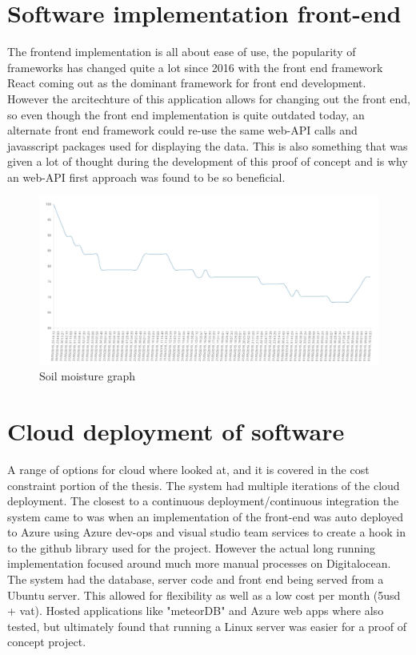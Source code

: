 \documentclass[]{uiophd}
\begin{document}
\section{Software implementation front-end}
The frontend implementation is all about ease of use, the popularity of frameworks has changed quite a lot since 2016 with the front end framework React coming out as the dominant framework for front end development. However the arcitechture of this application allows for changing out the front end, so even though the front end implementation is quite outdated today, an alternate front end framework could re-use the same web-API calls and javasscript packages used for displaying the data. This is also something that was given a lot of thought during the development of this proof of concept and is why an web-API first approach was found to be so beneficial. 

 \begin{figure}[h]
\caption{Soil moisture graph}
\centering
\includegraphics[width=12cm]{watergraph.png}
\end{figure}

\section{Cloud deployment of software}
A range of options for cloud where looked at, and it is covered in the cost constraint portion of the thesis. The system had multiple iterations of the cloud deployment. The closest to a continuous deployment/continuous integration the system came to was when an implementation of the front-end was auto deployed to Azure using Azure dev-ops and visual studio team services to create a hook in to the github library used for the project. However the actual long running implementation focused around much more manual processes on Digitalocean. The system had the database, server code and front end being served from a Ubuntu server. This allowed for flexibility as well as a low cost per month (5usd + vat). Hosted applications like "meteorDB" and Azure web apps where also tested, but ultimately found that running a Linux server was easier for a proof of concept project.
\end{document}

